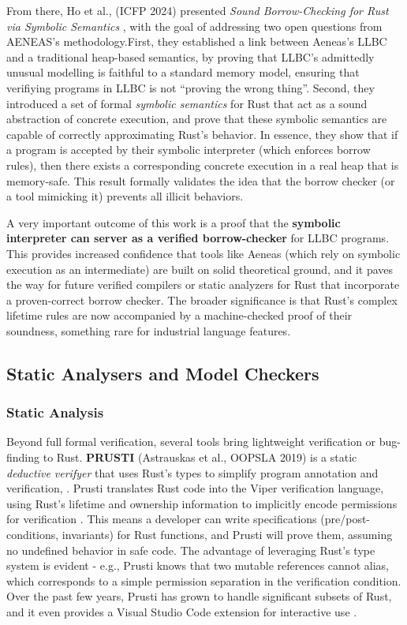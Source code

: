 From there, Ho et al., (ICFP 2024) presented \textit{Sound Borrow-Checking for
Rust via Symbolic Semantics} \cite{AENEAS_PART_2}, with the goal of addressing two
open questions from AENEAS's methodology.First, they established a link between
Aeneas's LLBC and a traditional heap-based semantics, by proving that LLBC's
admittedly unusual modelling is faithful to a standard memory model, ensuring
that verifiying programs in LLBC is not ``proving the wrong thing''. Second,
they introduced a set of formal \textit{symbolic semantics} for Rust that act as
a sound abstraction of concrete execution, and prove that these symbolic
semantics are capable of correctly approximating Rust's behavior.  In essence,
they show that if a program is accepted by their symbolic interpreter (which
enforces borrow rules), then there exists a corresponding concrete execution in
a real heap that is memory-safe. This result formally validates the idea that
the borrow checker (or a tool mimicking it) prevents all illicit behaviors.

A very important outcome of this work is a proof that the \textbf{symbolic
interpreter can server as a verified borrow-checker} for LLBC programs. This
provides increased confidence that tools like Aeneas (which rely on symbolic
execution as an intermediate) are built on solid theoretical ground, and it
paves the way for future verified compilers or static analyzers for Rust that
incorporate a proven-correct borrow checker. The broader significance is that
Rust's complex lifetime rules are now accompanied by a machine-checked proof of
their soundness, something rare for industrial language features.

\subsection{Static Analysers and Model Checkers}
\subsubsection*{Static Analysis}
Beyond full formal verification, several tools bring lightweight verification or
bug-finding to Rust. \textbf{PRUSTI} (Astrauskas et al., OOPSLA 2019) is a
static \textit{deductive verifyer} that uses Rust's types to simplify program
annotation and verification, \cite{prust_in_practice}.
Prusti translates Rust code into the Viper verification language, using Rust's
lifetime and ownership information to implicitly encode permissions for
verification \cite{prusti_project}. This means a developer can write
specifications (pre/post-conditions, invariants) for Rust functions, and Prusti
will prove them, assuming no undefined behavior in safe code. The advantage of
leveraging Rust's type system is evident - e.g., Prusti knows that two mutable
references cannot alias, which corresponds to a simple permission separation in
the verification condition. Over the past few years, Prusti has grown to handle
significant subsets of Rust, and it even provides a Visual Studio Code extension
for interactive use \cite{prusti_github}.

